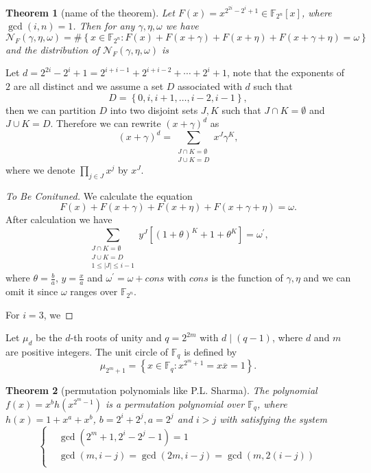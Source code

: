 \documentclass[12 pt]{article}
\newtheorem{theorem}{Theorem}
\def\F{{\mathbb F}}
\begin{document}
    \begin{theorem}[name of the theorem]
      Let $ F(x) = x^{2^{2i}-2^i+1}\in\F_{2^n}[x] $, where $ \gcd(i,n) = 1 $. Then for any $ \gamma,\eta,\omega $ we have 
      \[\mathcal{N}_F(\gamma,\eta,\omega)=\#\left\{ x\in\F_{2^n}:F(x)+F(x+\gamma)+F(x+\eta)+F(x+\gamma+\eta) = \omega \right\}\] 
      and the distribution of $ \mathcal{N}_F(\gamma,\eta,\omega) $ is 

    \end{theorem}
    Let $ d=2^{2i}-2^i+1=2^{i+i-1}+2^{i+i-2}+\cdots+2^i+1 $, note that the exponents of $ 2 $ are all distinct and we assume 
    a set $ D $ associated with $ d $ such that 
    \[D=\left\{ 0,i,i+1,\dots,i-2,i-1 \right\},\]
    then we can partition $ D $ into two disjoint sets $ J,K $ such that $ J\cap K=\emptyset $ and $ J\cup K=D $.
    Therefore we can rewrite $ (x+\gamma)^d $ as 
    \[ (x+\gamma)^d=\sum_{\substack{J\cap K=\emptyset\\J\cup K=D}}x^J\gamma^K, \]
    where we denote $ \prod_{j\in J}x^j $ by $ x^J $.
    \begin{proof}[To Be Conituned]
      We calculate the equation 
      \[F(x)+F(x+\gamma)+F(x+\eta)+F(x+\gamma+\eta) = \omega.\]
      After calculation we have 
      \[\sum_{\substack{J\cap K=\emptyset\\J\cup K=D\\1\le|J|\le i-1}}y^J\left[ \left( 1+\theta \right)^K+1+ \theta^K \right] = \omega^{\prime},\]
      where $ \theta=\frac{b}{a} $, $ y=\frac{x}{a} $ and $ \omega^{\prime}=\omega+cons $ with $ cons $ is the function of $ \gamma,\eta $ and we can 
      omit it since $ \omega $ ranges over $ \F_{2^n} $.

      For $ i=3 $, we 
    \end{proof}
      Let $ \mu_d $ be the $ d $-th roots of unity and $ q=2^{2m} $ with $ d\mid(q-1) $, where 
      $ d $ and $ m $ are positive integers. The unit circle of $ \F_q $ is defined by 
      \[\mu_{2^m+1}=\left\{ x\in\F_{q}:x^{2^m+1}=x\overline{x}=1 \right\}.\]
    \begin{theorem}[permutation polynomials like P.L. Sharma]
      The polynomial $ f(x)=x^bh(x^{2^m-1}) $ is a permutation polynomial over $ \F_{q} $, 
      where $ h(x)=1+x^a+x^b $, $ b=2^i+2^j,a=2^j $ and $ i>j $ with satisfying the system 
      \begin{equation}
        \left\{ 
        \begin{aligned}
          &\gcd(2^m+1,2^i-2^j-1)=1\\
          &\gcd(m,i-j)=\gcd(2m,i-j)=\gcd(m,2(i-j))\\
        \end{aligned}\right.
      \end{equation}
    \end{theorem}
\end{document}
